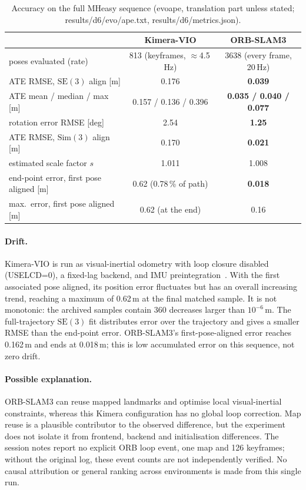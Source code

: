 \documentclass[11pt,a4paper]{article}
\DeclareRobustCommand{\code}[1]{\begingroup\ttfamily\codebreaks#1\endgroup}
\newcommand{\codebreaks}{\renewcommand{\_}{\textunderscore\allowbreak}}
\begin{document}
\begin{table}[H]
\centering\small
\begin{tabular}{lcc}
\toprule
 & Kimera-VIO & ORB-SLAM3 \\
\midrule
poses evaluated (rate) & 813 (keyframes, $\approx$4.5\,Hz) & 3638 (every frame, 20\,Hz)\\
ATE RMSE, $\mathrm{SE}(3)$ align [m] & 0.176 & \textbf{0.039} \\
ATE mean / median / max [m] & 0.157 / 0.136 / 0.396 & \textbf{0.035 / 0.040 / 0.077} \\
rotation error RMSE [deg] & 2.54 & \textbf{1.25} \\
ATE RMSE, $\mathrm{Sim}(3)$ align [m] & 0.170 & \textbf{0.021} \\
estimated scale factor $s$ & 1.011 & 1.008 \\
end-point error, first pose aligned [m] & 0.62 (0.78\,\% of path) & \textbf{0.018} \\
max.\ error, first pose aligned [m] & 0.62 (at the end) & 0.16 \\
\bottomrule
\end{tabular}
\caption{Accuracy on the full \code{MH\_01\_easy} sequence (\code{evo\_ape}, translation part unless
stated; \code{results/d6/evo/ape\_*.txt}, \code{results/d6/metrics.json}).}
\label{tab:ate}
\end{table}

\paragraph{Drift.} Kimera-VIO is run as visual-inertial odometry with loop closure disabled
(\code{USE\_LCD=0}), a fixed-lag backend, and IMU preintegration~\cite{forster2017preintegration}.
With the first associated pose aligned, its position error fluctuates but has an overall
increasing trend, reaching a maximum of 0.62\,m at the final matched sample. It is not
monotonic: the archived samples contain 360 decreases larger than $10^{-6}$\,m.
The full-trajectory $\mathrm{SE}(3)$ fit distributes error over the trajectory and gives a
smaller RMSE than the end-point error. ORB-SLAM3's first-pose-aligned error reaches
0.162\,m and ends at 0.018\,m; this is low accumulated error on this sequence, not zero drift.

\paragraph{Possible explanation.} ORB-SLAM3 can reuse mapped landmarks and optimise
local visual-inertial constraints, whereas this Kimera configuration has no global loop
correction. Map reuse is a plausible contributor to the observed difference, but the
experiment does not isolate it from frontend, backend and initialisation differences.
The session notes report no explicit ORB loop event, one map and 126 keyframes; without
the original log, these event counts are not independently verified. No causal attribution
or general ranking across environments is made from this single run.
\end{document}
